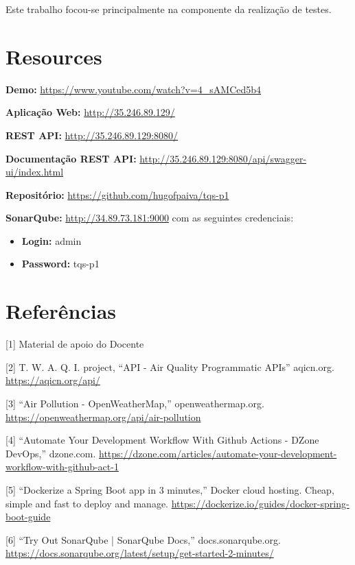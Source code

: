 \documentclass[10pt,english]{article}
\begin{document}
\par Este trabalho focou-se principalmente na componente da realização de testes.

\section{Resources}

\par \textbf{Demo:} \url{https://www.youtube.com/watch?v=4_sAMCed5b4}

\par \textbf{Aplicação Web:} \url{http://35.246.89.129/}

\par \textbf{REST API:} \url{http://35.246.89.129:8080/}

\par \textbf{Documentação REST API:} \url{http://35.246.89.129:8080/api/swagger-ui/index.html}

\par \textbf{Repositório:} \href{https://github.com/hugofpaiva/tqs-p1}{https://github.com/hugofpaiva/tqs-p1}

\par \textbf{SonarQube:} \href{http://34.89.73.181:9000}{http://34.89.73.181:9000} com as seguintes credenciais:

\begin{itemize}
    \item \textbf{Login:} admin
    \item \textbf{Password:} tqs-p1
\end{itemize}


\section{Referências}





[1] Material de apoio do Docente

[2] T. W. A. Q. I. project, “API - Air Quality Programmatic APIs” aqicn.org. \url{https://aqicn.org/api/}

[3] “Air Pollution - OpenWeatherMap,” openweathermap.org. \url{https://openweathermap.org/api/air-pollution}

[4] “Automate Your Development Workflow With Github Actions - DZone DevOps,” dzone.com. \url{https://dzone.com/articles/automate-your-development-workflow-with-github-act-1}

[5] “Dockerize a Spring Boot app in 3 minutes,” Docker cloud hosting. Cheap, simple and fast to deploy and manage. \url{https://dockerize.io/guides/docker-spring-boot-guide}

[6] “Try Out SonarQube | SonarQube Docs,” docs.sonarqube.org. \url{https://docs.sonarqube.org/latest/setup/get-started-2-minutes/}
\end{document}
